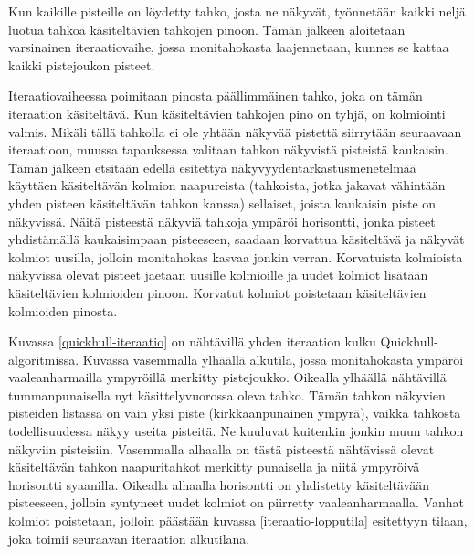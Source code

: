 \documentclass[12pt,a4paper,titlepage]{article}
\begin{document}
Kun kaikille pisteille on löydetty tahko, josta ne näkyvät, työnnetään kaikki neljä luotua tahkoa käsiteltävien tahkojen pinoon. Tämän jälkeen aloitetaan varsinainen iteraatiovaihe, jossa monitahokasta laajennetaan, kunnes se kattaa kaikki pistejoukon pisteet.\cite{quickhull}

Iteraatiovaiheessa poimitaan pinosta päällimmäinen tahko, joka on tämän iteraation käsiteltävä. Kun käsiteltävien tahkojen pino on tyhjä, on kolmiointi valmis. Mikäli tällä tahkolla ei ole yhtään näkyvää pistettä siirrytään seuraavaan iteraatioon, muussa tapauksessa valitaan tahkon näkyvistä pisteistä kaukaisin. Tämän jälkeen etsitään edellä esitettyä näkyvyydentarkastusmenetelmää käyttäen käsiteltävän kolmion naapureista (tahkoista, jotka jakavat vähintään yhden pisteen käsiteltävän tahkon kanssa) sellaiset, joista kaukaisin piste on näkyvissä. Näitä pisteestä näkyviä tahkoja ympäröi horisontti, jonka pisteet yhdistämällä kaukaisimpaan pisteeseen, saadaan korvattua käsiteltävä ja näkyvät kolmiot uusilla, jolloin monitahokas kasvaa jonkin verran. Korvatuista kolmioista näkyvissä olevat pisteet jaetaan uusille kolmioille ja uudet kolmiot lisätään käsiteltävien kolmioiden pinoon. Korvatut kolmiot poistetaan käsiteltävien kolmioiden pinosta.\cite{quickhull}

Kuvassa \ref{quickhull-iteraatio} on nähtävillä yhden iteraation kulku Quickhull-algoritmissa. Kuvassa vasemmalla ylhäällä alkutila, jossa monitahokasta ympäröi vaaleanharmailla ympyröillä merkitty pistejoukko. Oikealla ylhäällä nähtävillä tummanpunaisella nyt käsittelyvuorossa oleva tahko. Tämän tahkon näkyvien pisteiden listassa on vain yksi piste (kirkkaanpunainen ympyrä), vaikka tahkosta todellisuudessa näkyy useita pisteitä. Ne kuuluvat kuitenkin jonkin muun tahkon näkyviin pisteisiin. Vasemmalla alhaalla on tästä pisteestä nähtävissä olevat käsiteltävän tahkon naapuritahkot merkitty punaisella ja niitä ympyröivä horisontti syaanilla. Oikealla alhaalla horisontti on yhdistetty käsiteltävään pisteeseen, jolloin syntyneet uudet kolmiot on piirretty vaaleanharmaalla. Vanhat kolmiot poistetaan, jolloin päästään kuvassa \ref{iteraatio-lopputila} esitettyyn tilaan, joka toimii seuraavan iteraation alkutilana.
\end{document}
